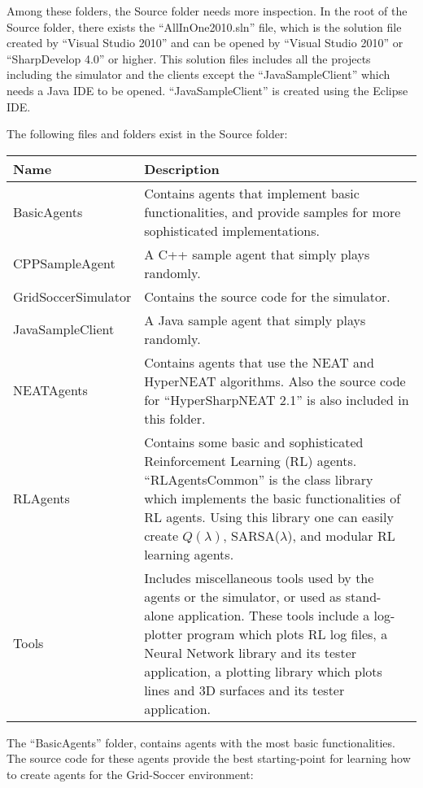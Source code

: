 \documentclass[12pt,titlepage,a4paper]{article}
\begin{document}
Among these folders, the Source folder needs more inspection. In the root of the Source folder, there exists the ``AllInOne2010.sln'' file, which is the solution file created by ``Visual Studio 2010'' and can be opened by ``Visual Studio 2010'' or ``SharpDevelop 4.0'' or higher. This solution files includes all the projects including the simulator and the clients except the ``JavaSampleClient'' which needs a Java IDE to be opened. ``JavaSampleClient'' is created using the Eclipse IDE.

The following files and folders exist in the Source folder:
\vspace{1cm}

\begin{tabular}{l|p{8cm}}
Name & Description \\ \hline
BasicAgents & Contains agents that implement basic functionalities, and provide samples for more sophisticated implementations. \\
CPPSampleAgent & A C++ sample agent that simply plays randomly. \\
GridSoccerSimulator & Contains the source code for the simulator. \\
JavaSampleClient & A Java sample agent that simply plays randomly. \\
NEATAgents & Contains agents that use the NEAT and HyperNEAT algorithms. Also the source code for ``HyperSharpNEAT 2.1'' is also included in this folder. \\
RLAgents & Contains some basic and sophisticated Reinforcement Learning (RL) agents. ``RLAgentsCommon'' is the class library which implements the basic functionalities of RL agents. Using this library one can easily create $Q(\lambda)$, SARSA($\lambda$), and modular RL learning agents. \\
Tools & Includes miscellaneous tools used by the agents or the simulator, or used as stand-alone application. These tools include a log-plotter program which plots RL log files, a Neural Network library and its tester application, a plotting library which plots lines and 3D surfaces and its tester application.
\end{tabular}
\vspace{1cm}

The ``BasicAgents'' folder, contains agents with the most basic functionalities. The source code for these agents provide the best starting-point for learning how to create agents for the Grid-Soccer environment:
\vspace{1cm}
\end{document}

